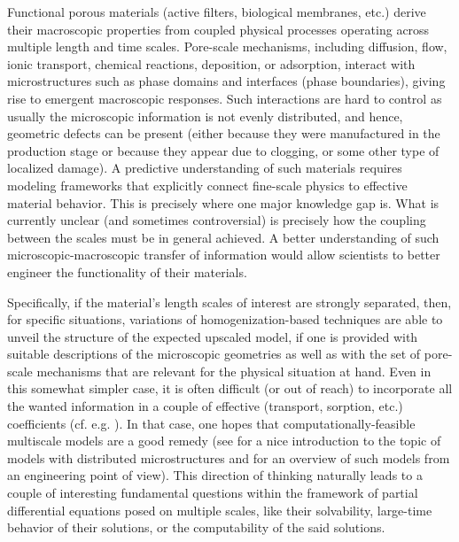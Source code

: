 \documentclass[reqno, 11pt]{amsart}
\numberwithin{equation}{section}
\begin{document}
Functional porous materials (active filters, biological membranes, etc.) derive their macroscopic properties from coupled physical processes operating across multiple length and time scales. Pore-scale mechanisms, including diffusion, flow, ionic transport, chemical reactions, deposition, or adsorption, interact with microstructures such as phase domains and interfaces (phase boundaries), giving rise to emergent macroscopic responses.
Such interactions are hard to control as usually the microscopic information is not evenly distributed, and hence, geometric defects can be present (either because they were manufactured in the production stage or because they appear due to clogging, or some other type of localized damage).
A predictive understanding of such materials requires modeling frameworks that explicitly connect fine-scale physics to effective material behavior.
This is precisely where one major knowledge gap is.
What is currently unclear (and sometimes controversial) is precisely how the coupling between the scales must be in general achieved. A better understanding of such microscopic-macroscopic transfer of information would allow scientists to better engineer the functionality of their materials.

Specifically, if the material's length scales of interest are strongly separated, then, for specific situations,  
variations of homogenization-based  techniques are able to unveil the structure of the expected upscaled model, 
if one is provided with suitable descriptions of the microscopic geometries as well as with the set of pore-scale mechanisms that are relevant for the physical situation at hand. Even in this somewhat simpler case, it is often difficult (or out of reach) to incorporate all the wanted information in a couple of effective (transport, sorption, etc.) coefficients (cf. e.g. \cite{Gruy,Ivan}).
In that case, one hopes that computationally-feasible multiscale models are a good remedy (see \cite{Showalter_Oberwolfach} for a nice introduction to the topic of models with distributed microstructures and \cite{otero_multiscale_2018} for an overview of such models from an engineering point of view).
This direction of thinking naturally leads to a couple of interesting fundamental questions within the framework of partial differential equations posed on multiple scales, like their solvability, large-time behavior of their solutions, or the computability of the said solutions.
\end{document}
